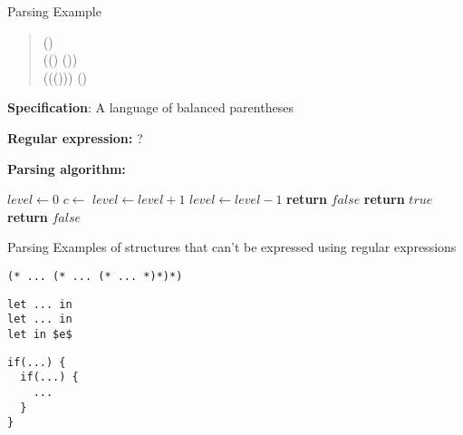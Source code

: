 \documentclass{beamer}
\begin{document}
\begin{frame}[fragile]{Parsing}
{Example}
\begin{scriptsize}
\begin{multicols}{2}
\begin{quote}
() \\
(() ()) \\
((())) () \\
\end{quote}

\textbf{\color{BrickRed}Specification}: A language of balanced parentheses

\textbf{\color{BrickRed}Regular expression:} ?
\end{multicols}
\end{scriptsize}

\pause

\begin{tiny}
\textbf{\color{BrickRed}Parsing algorithm:}
\begin{center}
\begin{minipage}{0.6\textwidth}
\begin{algorithmic}[0]
	\State $level \gets 0$
		\State $c \gets$ 
			\State $level \gets level + 1$
			\State $level \gets level - 1$
		\EndIf
			\State \textbf{return} $false$
		\EndIf
	\EndWhile
			\State \textbf{return} $true$
		\Else
			\State \textbf{return} $false$
		\EndIf
\EndProcedure
\end{algorithmic}
\end{minipage}
\end{center}
\end{tiny}

\end{frame}

\begin{frame}[fragile]{Parsing}
{Examples of structures that can't be expressed using regular expressions}
\begin{lstlisting}[style=camlcode]
(* ... (* ... (* ... *)*)*)
\end{lstlisting}
\begin{lstlisting}[style=camlcode]
let ... in
let ... in 
let in $e$ 
\end{lstlisting}
\begin{lstlisting}[style=javacode]
if(...) {
  if(...) {
    ...
  }
}
\end{lstlisting}

\end{frame}
\end{document}
